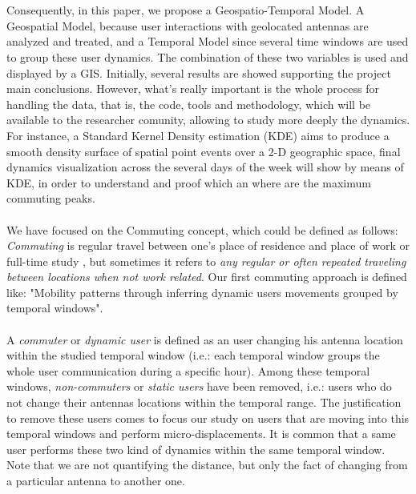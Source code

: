 \\
\\
Consequently, in this paper, we propose a Geospatio-Temporal Model. A Geospatial Model, because user interactions with geolocated antennas are analyzed and treated, and a Temporal Model since several time windows are used to group these user dynamics. The combination of these two variables is used and displayed by a GIS. Initially, several results are showed supporting the project main conclusions. However, what's really important is the whole process for handling the data, that is, the code, tools and methodology, which will be available to the researcher comunity, allowing to study more deeply the dynamics. For instance, a Standard Kernel Density estimation (KDE) aims to produce a smooth density surface of spatial point events over a 2-D geographic space\citep{SIM:SIM4780090616,5969036}, final dynamics visualization across the several days of the week will show by means of KDE, in order to understand and proof which an where are the maximum commuting peaks. 
\\
\\
We have focused on the Commuting concept, which could be defined as follows: \emph{Commuting} is regular travel between one's place of residence and place of work or full-time study \citep{wiki:commuting}, but  sometimes it refers to \emph{any regular or often repeated traveling between locations when not work related}. Our first commuting approach is defined like: "Mobility patterns through inferring dynamic users movements grouped by temporal windows". 
\\
\\
A {\it commuter} or {\it dynamic user} is defined as an user changing his antenna location within the studied temporal window (i.e.: each temporal window groups the whole user communication during a specific hour). Among these temporal windows, {\it non-commuters} or {\it static users} have been removed, i.e.: users who do not change their antennas locations within the temporal range. The justification to remove these users comes to focus our study on users that are moving into this temporal windows and perform micro-displacements. It is common that a same user performs these two kind of dynamics within the same temporal window. Note that we are not quantifying the distance, but only the fact of changing from a particular antenna to another one.
\\
\\